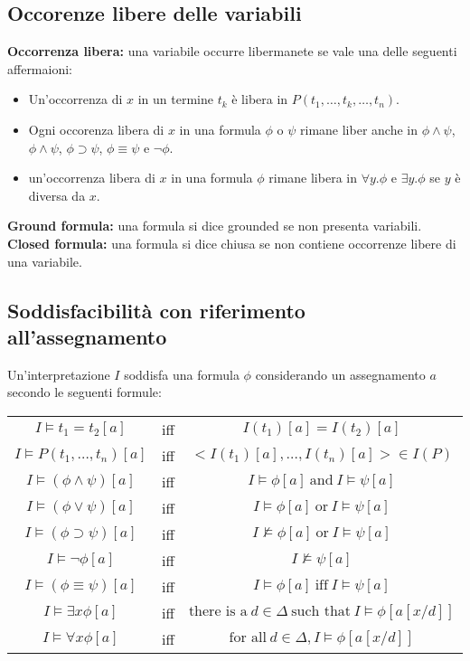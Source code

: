\documentclass[../main.tex]{subfiles}
\begin{document}
   \subsection{Occorenze libere delle variabili}
   \textbf{Occorrenza libera:} una variabile occurre libermanete se vale una delle seguenti affermaioni:
   \begin{itemize}
      \item Un'occorrenza di $x$ in un termine $t_k$ è libera in $P(t_1, \dots , t_k, \dots , t_n)$.
      \item Ogni occorenza libera di $x$ in una formula $\phi$ o $\psi$ rimane liber anche in $\phi \land \psi$, $\phi \land \psi$, $\phi \supset \psi$, $\phi \equiv \psi$ e $\lnot \phi$.
      \item un'occorrenza libera di $x$ in una formula $\phi$ rimane libera in $\forall y.\phi$ e $\exists y.\phi$ se $y$ è diversa da $x$.
   \end{itemize}
   \textbf{Ground formula:} una formula si dice grounded se non presenta variabili.\\
   \textbf{Closed formula:} una formula si dice chiusa se non contiene occorrenze libere di una variabile.

   \subsection{Soddisfacibilità con riferimento all'assegnamento}
   Un'interpretazione $I$ soddisfa una formula $\phi$ considerando un assegnamento $a$ secondo le seguenti formule:
   \begin{center}
      \begin{tabular}{c c c}
         $I \models t_1 = t_2[a]$ & iff & $I(t_1)[a]=I(t_2)[a]$\\
         $I \models P(t_1, \dots, t_n)[a]$ & iff & $<I(t_1)[a], \dots, I(t_n)[a] > \in I(P)$\\
         $I \models (\phi \land \psi)[a]$ & iff & $I \models \phi[a]\ \text{and}\ I \models \psi[a]$\\
         $I \models (\phi \lor \psi)[a]$ & iff & $I \models \phi[a]\ \text{or}\ I \models \psi[a]$\\
         $I \models (\phi \supset \psi)[a]$ & iff & $I \not \models \phi[a]\ \text{or}\ I \models \psi[a]$\\
         $I \models \lnot \phi[a]$ & iff & $I \not \models \psi[a]$\\
         $I \models (\phi \equiv \psi)[a]$ & iff & $I \models \phi[a]\ \text{iff}\ I \models \psi[a]$\\
         $I \models \exists x \phi[a]$ & iff & $\text{there is a}\ d \in \Delta\ \text{such that}\ I \models \phi[a[x/d]]$\\
         $I \models \forall x \phi[a]$ & iff & $\text{for all}\ d \in \Delta, I \models \phi[a[x/d]]$
      \end{tabular}
   \end{center}
\end{document}
